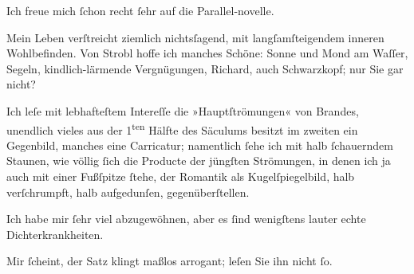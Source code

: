 \pstart
           {\pb}Ich freue mich ſchon recht ſehr
               auf die Parallel-novelle.\pend
           
\pstart
           Mein Leben verſtreicht ziemlich nichtsſagend, mit \introOben{}langſam\introOben{}{ }ſteigendem inneren Wohlbefinden. Von Strobl hoffe ich manches Schöne: Sonne und Mond am
               Waſſer, Segeln, kindlich-lärmende Vergnügungen, Richard, auch Schwarzkopf; nur Sie
               gar nicht?\pend
           
\pstart
           Ich leſe mit lebhafteſtem Intereſſe die »Hauptſtrömungen« von Brandes,
               unendlich vieles aus der 1\textsuperscript{ten} Hälfte des Säculums besitzt
               im zweiten ein Gegenbild, manches eine Carricatur; namentlich ſehe ich mit halb
               ſchauerndem Staunen, {\pb}wie völlig
               ſich die \introOben{}Producte der\introOben{} jüngſten Strömungen, in denen ich ja
               auch mit einer Fußſpitze ſtehe, der Romantik als Kugelſpiegelbild, halb verſchrumpft,
               halb aufgedunſen, gegenüberſtellen.\pend
           
\pstart
           Ich habe mir ſehr viel abzugewöhnen, aber es ſind wenigſtens lauter echte
               Dichterkrankheiten.\pend
           
\pstart
           Mir ſcheint, der Satz klingt maßlos arrogant; leſen Sie ihn nicht ſo.\pend
           
